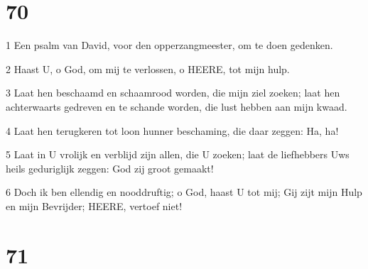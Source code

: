 \chapter{70}

\par 1 Een psalm van David, voor den opperzangmeester, om te doen gedenken.
\par 2 Haast U, o God, om mij te verlossen, o HEERE, tot mijn hulp.
\par 3 Laat hen beschaamd en schaamrood worden, die mijn ziel zoeken; laat hen achterwaarts gedreven en te schande worden, die lust hebben aan mijn kwaad.
\par 4 Laat hen terugkeren tot loon hunner beschaming, die daar zeggen: Ha, ha!
\par 5 Laat in U vrolijk en verblijd zijn allen, die U zoeken; laat de liefhebbers Uws heils geduriglijk zeggen: God zij groot gemaakt!
\par 6 Doch ik ben ellendig en nooddruftig; o God, haast U tot mij; Gij zijt mijn Hulp en mijn Bevrijder; HEERE, vertoef niet!

\chapter{71}

